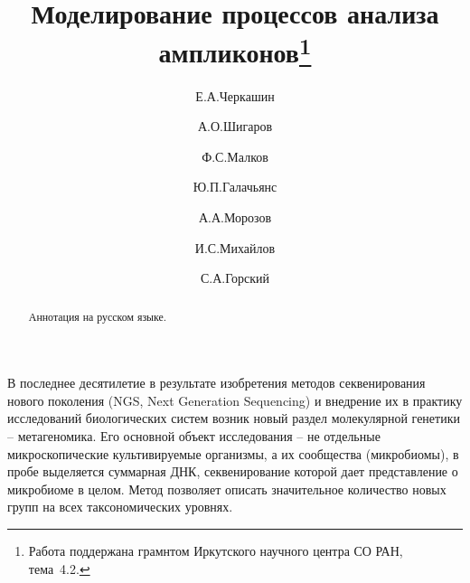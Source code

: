 \documentclass[12pt]{llncs}  %
\begin{document}
%

\title{Моделирование процессов анализа ампликонов\thanks{Работа поддержана грамнтом Иркутского научного центра СО РАН, тема\textnumero~4.2.}}
\author{Е.А.Черкашин  %
  \and  %
  А.О.Шигаров \and
  Ф.С.Малков \and
  Ю.П.Галачьянс \and
  А.А.Морозов \and
  И.С.Михайлов \and
  С.А.Горский
} %


\maketitle

\begin{abstract}
Аннотация на русском языке.

\end{abstract}

В последнее десятилетие в результате изобретения методов секвенирования нового поколения (NGS, Next Generation Sequencing) и внедрение их в практику исследований биологических систем возник новый раздел молекулярной генетики -- метагеномика. Его основной объект исследования -- не отдельные микроскопические культивируемые организмы, а их сообщества (микробиомы), в пробе выделяется суммарная ДНК, секвенирование которой дает представление  о микробиоме в целом.  Метод позволяет описать значительное количество новых групп на всех таксономических уровнях.
\end{document}
